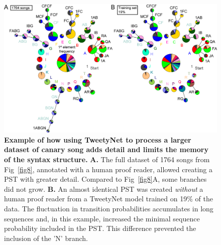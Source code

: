 \documentclass[10pt,letterpaper]{article}
\begin{document}
\begin{figure}[!ht]
\includegraphics[scale=0.85]{Figures/fig9/Figure9_v3.png}
\caption{{\bf Example of how using TweetyNet to process a larger dataset of canary song adds detail and limits the memory of the syntax structure.}
\textbf{A.} The full dataset of 1764 songs from Fig~\ref{fig8}, annotated with a human proof reader, allowed creating a PST with greater detail. Compared to Fig~\ref{fig8}A, some branches did not grow.
\textbf{B.} An almost identical PST was created \textit{without} a human proof reader from a TweetyNet model trained on 19\% of the data. The fluctuation in transition probabilities accumulates in long sequences and, in this example, increased the minimal sequence probability included in the PST. This difference prevented the inclusion of the 'N' branch.}
\label{fig9}
\end{figure}
\end{document}
